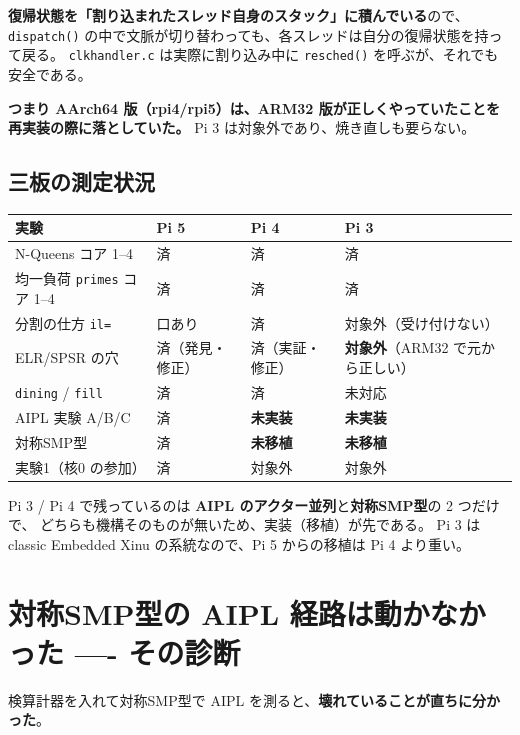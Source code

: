 \documentclass[a4paper,11pt]{ltjsarticle}
\begin{document}
\noindent
\textbf{復帰状態を「割り込まれたスレッド自身のスタック」に積んでいる}ので、
\texttt{dispatch()} の中で文脈が切り替わっても、各スレッドは自分の復帰状態を持って戻る。
\texttt{clkhandler.c} は実際に割り込み中に \texttt{resched()} を呼ぶが、それでも安全である。

\textbf{つまり AArch64 版（rpi4/rpi5）は、ARM32 版が正しくやっていたことを
再実装の際に落としていた。} Pi 3 は対象外であり、焼き直しも要らない。

\subsection{三板の測定状況}

\begin{center}
\begin{tabular}{llll}
\toprule
実験 & Pi 5 & Pi 4 & Pi 3 \\
\midrule
N-Queens コア 1--4 & 済 & 済 & 済 \\
均一負荷 \texttt{primes} コア 1--4 & 済 & 済 & 済 \\
分割の仕方 \texttt{il=} & 口あり & 済 & 対象外（受け付けない） \\
ELR/SPSR の穴 & 済（発見・修正） & 済（実証・修正） & \textbf{対象外}（ARM32 で元から正しい） \\
\texttt{dining} / \texttt{fill} & 済 & 済 & 未対応 \\
AIPL 実験 A/B/C & 済 & \textbf{未実装} & \textbf{未実装} \\
対称SMP型 & 済 & \textbf{未移植} & \textbf{未移植} \\
実験1（核0 の参加） & 済 & 対象外 & 対象外 \\
\bottomrule
\end{tabular}
\end{center}

\noindent
Pi 3 / Pi 4 で残っているのは \textbf{AIPL のアクター並列}と\textbf{対称SMP型}の 2 つだけで、
どちらも機構そのものが無いため、実装（移植）が先である。
Pi 3 は classic Embedded Xinu の系統なので、Pi 5 からの移植は Pi 4 より重い。


\section{対称SMP型の AIPL 経路は動かなかった ---- その診断}\label{sec:symbroken}

検算計器を入れて対称SMP型で AIPL を測ると、\textbf{壊れていることが直ちに分かった}。
\end{document}
